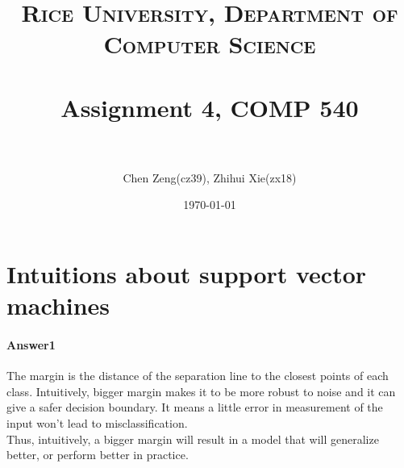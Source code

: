 \documentclass[paper=a4, fontsize=11pt]{scrartcl} %
\title{	
\normalfont \normalsize
\textsc{Rice University, Department of Computer Science} \\ [25pt] %
\horrule{0.5pt} \\[0.4cm] %
\huge Assignment 4, COMP 540 \\ %
\horrule{2pt} \\[0.5cm] %
}
\author{Chen Zeng(cz39), Zhihui Xie(zx18)} %
\date{\normalsize\today} %
\numberwithin{equation}{section} %
\numberwithin{figure}{section} %
\numberwithin{table}{section} %
\begin{document}
\maketitle %

\section{Intuitions about support vector machines}
\paragraph{\textbf{Answer1}}

The margin is the distance of the separation line to the closest points of each class. Intuitively, bigger margin makes it to be more robust to noise and it can give a safer decision boundary. It means a little error in measurement of the input won't lead to misclassification. 
\\ Thus, intuitively, a bigger margin will result in a model that will generalize better, or perform better in practice.
\end{document}
